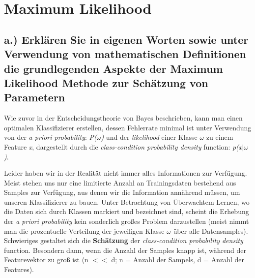 \section{Maximum Likelihood}
\subsection*{a.) Erklären Sie in eigenen Worten sowie unter Verwendung von mathematischen Definitionen die grundlegenden Aspekte der Maximum Likelihood Methode zur Schätzung von \newline Parametern}

Wie zuvor in der Entscheidungstheorie von Bayes beschrieben, kann man einen optimalen Klassifizierer erstellen, dessen Fehlerrate minimal ist unter
Verwendung von der \textit{a priori probability}: \textit{P($\omega$)} und der \textit{likelihood} einer Klasse $\omega$ zu einem Feature \textit{x}, dargestellt durch die \textit{class-condition probability density} function: \textit{p(x$\mid$$\omega$)}.

Leider haben wir in der Realität nicht immer alles Informationen zur Verfügung. Meist stehen uns nur eine limitierte
Anzahl an Trainingsdaten bestehend aus Samples zur Verfügung, aus denen wir die Information annährend müssen, um unseren Klassifizierer zu bauen.
Unter Betrachtung von Überwachtem Lernen, wo die Daten sich durch Klassen markiert und bezeichnet sind, scheint die Erhebung der \textit{a priori probability} kein sonderlich
großes Problem darzustellen (meist nimmt man die prozentuelle Verteilung der jeweiligen Klasse $\omega$ über alle Datensamples). Schwieriges gestaltet sich die \textbf{Schätzung} der \textit{class-condition probability density} function. Besondern dann, wenn die Anzahl der
Samples knapp ist, während der Featurevektor zu groß ist (n $<<$ d; n = Anzahl der Sampels, d = Anzahl der Features). 

